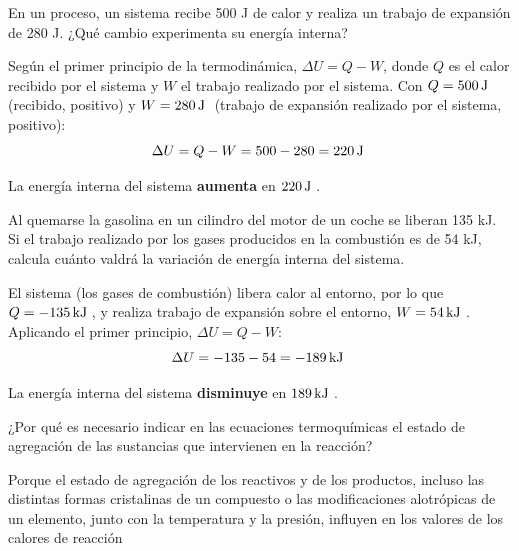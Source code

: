 \begin{question}
    En un proceso, un sistema recibe 500 J de calor y realiza un trabajo de expansión de 280 J.
    ¿Qué cambio experimenta su energía interna?


    \begin{solu}


        Según el primer principio de la termodinámica, \(\Delta U = Q - W\), donde \(Q\) es el calor recibido por el sistema y \(W\) el trabajo realizado por el sistema. Con \(Q = \energia[j]{500}\) (recibido, positivo) y \(W = \energia[j]{280}\) (trabajo de expansión realizado por el sistema, positivo):
        \[
            \Delta U = Q - W = 500 - 280 = \energia[j]{220}
        \]

        La energía interna del sistema \textbf{aumenta} en \(\energia[j]{220}\).
    \end{solu}
\end{question}

\begin{question}
    Al quemarse la gasolina en un cilindro del motor de un coche se liberan 135 kJ. Si el trabajo
    realizado por los gases producidos en la combustión es de 54 kJ, calcula cuánto valdrá la
    variación de energía interna del sistema.


    \begin{solu}
        El sistema (los gases de combustión) libera calor al entorno, por lo que \(Q = \energia[kj]{-135}\), y realiza trabajo de expansión sobre el entorno, \(W = \energia[kj]{54}\). Aplicando el primer principio, \(\Delta U = Q - W\):
        \[
            \Delta U = -135 - 54 = \energia[kj]{-189}
        \]

        La energía interna del sistema \textbf{disminuye} en \(\energia[kj]{189}\).
    \end{solu}
\end{question}

\begin{question}
    ¿Por qué es necesario indicar en las ecuaciones termoquímicas el estado de agregación de
    las sustancias que intervienen en la reacción?


    \begin{solu}
        Porque el estado de agregación de los reactivos y de los productos, incluso las distintas formas
        cristalinas de un compuesto o las modificaciones alotrópicas de un elemento, junto con la temperatura y la presión, influyen en los valores de los calores de reacción
    \end{solu}
\end{question}

